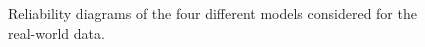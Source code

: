 \documentclass[11pt]{article}
\theoremstyle{definition}
\theoremstyle{definition}
\begin{document}
\begin{figure}
        
        
        
        \caption{Reliability diagrams of the four different models considered for the real-world data.}
        
        
                \label{RelDiagramMo}
\end{figure}



\begin{figure}
        \centering
 

\end{figure}
\end{document}
